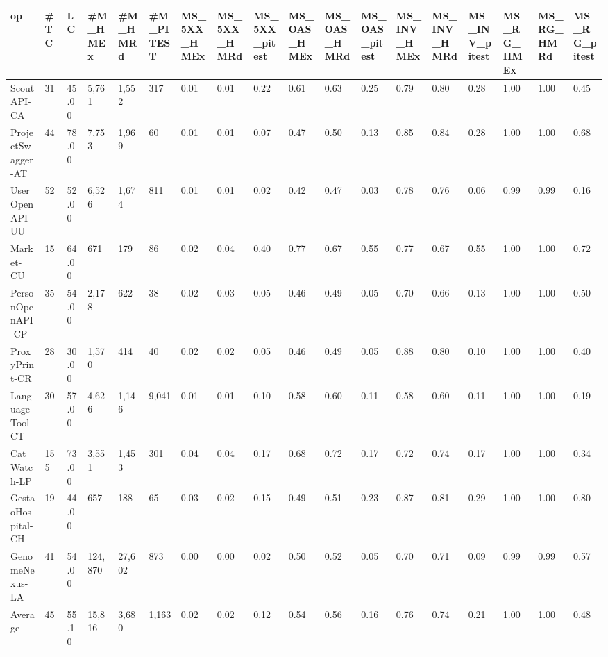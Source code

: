 \begin{tabular}{llllllllllllllllll}
\toprule
op & #TC & LC & #M_HMEx & #M_HMRd & #M_PITEST & MS_5XX_HMEx & MS_5XX_HMRd & MS_5XX_pitest & MS_OAS_HMEx & MS_OAS_HMRd & MS_OAS_pitest & MS_INV_HMEx & MS_INV_HMRd & MS_INV_pitest & MS_RG_HMEx & MS_RG_HMRd & MS_RG_pitest \\
\midrule
ScoutAPI-CA & 31 & 45.00 & 5,761 & 1,552 & 317 & 0.01 & 0.01 & 0.22 & 0.61 & 0.63 & 0.25 & 0.79 & 0.80 & 0.28 & 1.00 & 1.00 & 0.45 \\
ProjectSwagger-AT & 44 & 78.00 & 7,753 & 1,969 & 60 & 0.01 & 0.01 & 0.07 & 0.47 & 0.50 & 0.13 & 0.85 & 0.84 & 0.28 & 1.00 & 1.00 & 0.68 \\
UserOpenAPI-UU & 52 & 52.00 & 6,526 & 1,674 & 811 & 0.01 & 0.01 & 0.02 & 0.42 & 0.47 & 0.03 & 0.78 & 0.76 & 0.06 & 0.99 & 0.99 & 0.16 \\
Market-CU & 15 & 64.00 & 671 & 179 & 86 & 0.02 & 0.04 & 0.40 & 0.77 & 0.67 & 0.55 & 0.77 & 0.67 & 0.55 & 1.00 & 1.00 & 0.72 \\
PersonOpenAPI-CP & 35 & 54.00 & 2,178 & 622 & 38 & 0.02 & 0.03 & 0.05 & 0.46 & 0.49 & 0.05 & 0.70 & 0.66 & 0.13 & 1.00 & 1.00 & 0.50 \\
ProxyPrint-CR & 28 & 30.00 & 1,570 & 414 & 40 & 0.02 & 0.02 & 0.05 & 0.46 & 0.49 & 0.05 & 0.88 & 0.80 & 0.10 & 1.00 & 1.00 & 0.40 \\
LanguageTool-CT & 30 & 57.00 & 4,626 & 1,146 & 9,041 & 0.01 & 0.01 & 0.10 & 0.58 & 0.60 & 0.11 & 0.58 & 0.60 & 0.11 & 1.00 & 1.00 & 0.19 \\
CatWatch-LP & 155 & 73.00 & 3,551 & 1,453 & 301 & 0.04 & 0.04 & 0.17 & 0.68 & 0.72 & 0.17 & 0.72 & 0.74 & 0.17 & 1.00 & 1.00 & 0.34 \\
GestaoHospital-CH & 19 & 44.00 & 657 & 188 & 65 & 0.03 & 0.02 & 0.15 & 0.49 & 0.51 & 0.23 & 0.87 & 0.81 & 0.29 & 1.00 & 1.00 & 0.80 \\
GenomeNexus-LA & 41 & 54.00 & 124,870 & 27,602 & 873 & 0.00 & 0.00 & 0.02 & 0.50 & 0.52 & 0.05 & 0.70 & 0.71 & 0.09 & 0.99 & 0.99 & 0.57 \\
Average & 45 & 55.10 & 15,816 & 3,680 & 1,163 & 0.02 & 0.02 & 0.12 & 0.54 & 0.56 & 0.16 & 0.76 & 0.74 & 0.21 & 1.00 & 1.00 & 0.48 \\
\bottomrule
\end{tabular}
